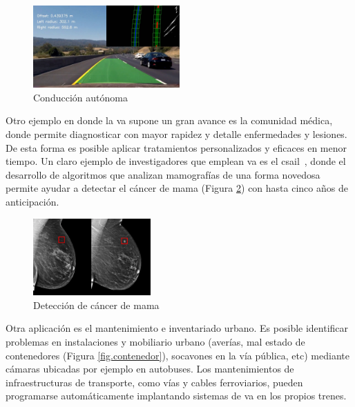 \begin{figure}[H]
  \begin{center}
    \includegraphics[width=0.5\textwidth]{figures/introduccion/car.jpg}
		\caption{Conducción autónoma}
		\label{fig.car}
		\end{center}
\end{figure}

Otro ejemplo en donde la \acrshort{va} supone un gran avance es la comunidad médica, donde permite diagnosticar con mayor rapidez y detalle enfermedades y lesiones. De esta forma es posible aplicar tratamientos personalizados y eficaces en menor tiempo. Un claro ejemplo de investigadores que emplean \acrshort{va} es el \acrfull{csail}~\cite{cancer}, donde el desarrollo de algoritmos que analizan mamografías de una forma novedosa permite ayudar a detectar el cáncer de mama (Figura \ref{fig.cancer}) con hasta cinco años de anticipación.\\

\begin{figure}[H]
  \begin{center}
    \includegraphics[width=0.4\textwidth]{figures/introduccion/cancer.png}
		\caption{Detección de cáncer de mama}
		\label{fig.cancer}
		\end{center}
\end{figure}


Otra aplicación es el mantenimiento e inventariado urbano. Es posible identificar problemas en instalaciones y mobiliario urbano (averías, mal estado de contenedores (Figura \ref{fig.contenedor}), socavones en la vía pública, etc) mediante cámaras ubicadas por ejemplo en autobuses. Los mantenimientos de infraestructuras de transporte, como vías y cables ferroviarios, pueden programarse automáticamente implantando sistemas de \acrshort{va} en los propios trenes. 


